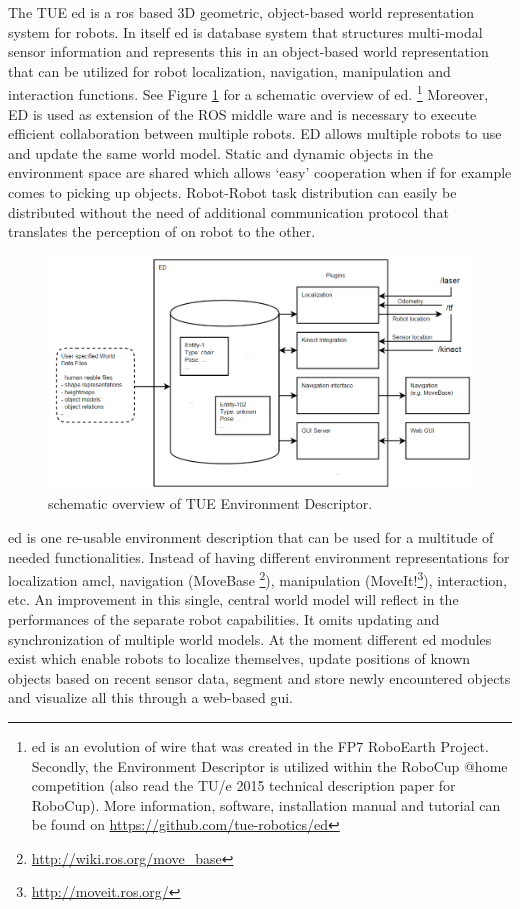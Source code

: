 The TUE \acrfull{ed} is a \acrfull{ros} based 3D geometric, object-based world representation system for robots. In itself \acrshort{ed} is database system that structures multi-modal sensor information and represents this in an object-based world representation that can be utilized for robot localization, navigation, manipulation and interaction functions. See Figure \ref{fig:ed} for a schematic overview of \acrshort{ed}. \footnote{\acrshort{ed} is an evolution of \acrfull{wire} that was created in the FP7 RoboEarth Project. Secondly, the Environment Descriptor is utilized within the RoboCup @home competition (also read the TU/e 2015 technical description paper for RoboCup). More information,  software, installation manual and tutorial can be found on \url{https://github.com/tue-robotics/ed}}
Moreover, ED is used as extension of the ROS middle ware and is necessary to execute efficient collaboration between multiple robots.  ED allows multiple robots to use and update the same world model. Static and dynamic objects in the environment space are shared which allows ‘easy’ cooperation when if for example comes to picking up objects. Robot-Robot task distribution can easily be distributed without the need of additional communication protocol that translates the perception of on robot to the other.
\begin{figure}[ht]
	\includegraphics[width = \linewidth]{Figures/ed_overview}
	\caption{schematic overview of TUE Environment Descriptor.}
	\label{fig:ed}
\end{figure}
\acrshort{ed} is one re-usable environment description that can be used for a multitude of needed functionalities. Instead of having different environment representations for localization \acrfull{amcl}, navigation (MoveBase \footnote{\url{http://wiki.ros.org/move_base}}), manipulation (MoveIt!\footnote{\url{http://moveit.ros.org/}}), interaction, etc. An improvement in this single, central world model will reflect in the performances of the separate robot capabilities. It omits updating and synchronization of multiple world models. At the moment different \acrshort{ed} modules exist which enable robots to localize themselves, update positions of known objects based on recent sensor data, segment and store newly encountered objects and visualize all this through a web-based \acrshort{gui}.
